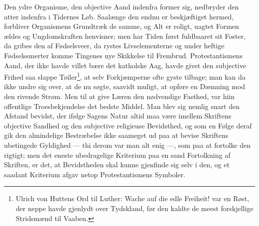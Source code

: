\documentclass[12pt]{book}
\newcommand{\opage}[1]{\marginnote{\footnotesize\textit{[#1]}}}
\begin{document}
Den ydre Organisme, den objective Aand indenfra former sig, nedbryder den
atter indenfra i Tidernes Løb. Saalænge den endnu er beskjæftiget hermed,
forbliver Organismens Grundtræk de samme, og Alt er roligt, uagtet Formen
ældes og Ungdomskraften henvisner; men har Tiden først fuldbaaret sit Foster,
da gribes den af Fødselsveer, da rystes Livselementerne og under heftige
Fødselssmerter komme Tingenes nye Skikkelse til Frembrud. Protestantismens
Aand, der ikke havde villet bære det katholske Aag, havde givet den
subjective Frihed saa slappe Tøiler\footnote{Ulrich von Huttens Ord til
Luther: Wache auf die edle Freiheit! var en Røst, der neppe havde gjenlydt
over Tydskland, før den kaldte de meest forskjellige Stridsmænd til Vaaben.},
at selv Forkjæmperne
\opage{72} \setcounter{footnote}{0}%
ofte gyste tilbage; man kan da ikke undre sig over, at de nu søgte, saavidt
muligt, at opføre en Dæmning mod den rivende Strøm. Men til at give Læren den
nødvendige Fasthed, var hiin offentlige Troesbekjendelse det bedste Middel.
Man blev sig nemlig snart den Afstand bevidst, der ifølge Sagens Natur altid
maa være imellem Skriftens objective Sandhed og den subjective religieuse
Bevidsthed, og som en Følge deraf gik den almindelige Bestræbelse ikke
saameget ud paa at bevise Skriftens ubetingede Gyldighed --- thi derom var man
alt enig ---, som paa at fortolke den rigtigt; men det eneste ubedragelige
Kriterium paa en sand Fortolkning af Skriften, er det, at Bevidstheden skal
kunne gjenfinde sig selv i den, og et saadant Kriterium afgav netop
Protestantismens Symboler.
\end{document}
